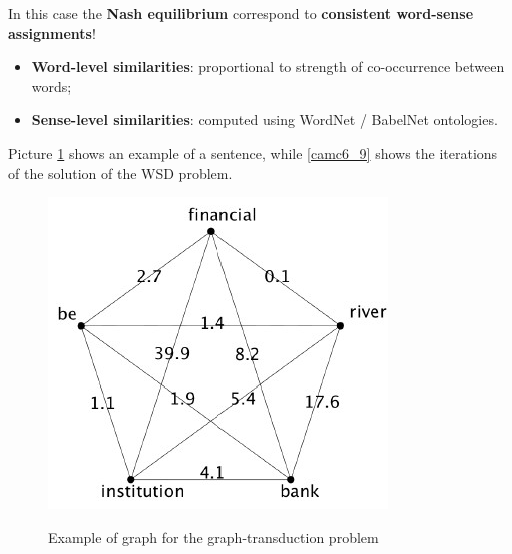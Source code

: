 In this case the \textbf{Nash equilibrium} correspond to \textbf{consistent word-sense assignments}!

\begin{itemize}
    \item \textbf{Word-level similarities}: proportional to strength of co-occurrence between words;
    \item \textbf{Sense-level similarities}: computed using WordNet / BabelNet ontologies.
\end{itemize}

Picture \ref{camc5} shows an example of a sentence, while \ref{camc6_9} shows the iterations of the solution of the WSD problem.

\begin{figure}[h!]
    \centering
    \includegraphics[scale = 1.4]{img/camc5.jpg}
    \label{camc5}
    \caption{Example of graph for the graph-transduction problem}
\end{figure}


